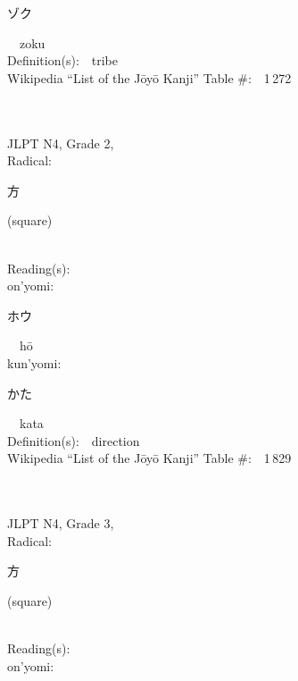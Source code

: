 \begin{multicols}{2}
{\hspace*{2em}}{\begin{CJK}{UTF8}{min} ゾク \end{CJK}}\ \ zoku\ \ \\
Definition(s):\ \ tribe \\
Wikipedia ``List of the J\=oy\=o Kanji'' Table \#:\ \ 1\,272 \\
\ \ \\
{\fontsize{34pt}{40pt}  }\ \ \\  %
{JLPT N4, Grade 2, \\Radical:\ \ {\begin{CJK}{UTF8}{min} 方 \end{CJK}} (square) } \\
Reading(s):\ \ \\
{\hspace*{1em}}on'yomi:\ \ \\
{\hspace*{2em}}{\begin{CJK}{UTF8}{min} ホウ \end{CJK}}\ \ h\=o\ \ \\
{\hspace*{1em}}kun'yomi:\ \ \\
{\hspace*{2em}}{\begin{CJK}{UTF8}{min} かた \end{CJK}}\ \ kata\ \ \\
Definition(s):\ \ direction \\
Wikipedia ``List of the J\=oy\=o Kanji'' Table \#:\ \ 1\,829 \\
\ \ \\
{\fontsize{34pt}{40pt}  }\ \ \\  %
{JLPT N4, Grade 3, \\Radical:\ \ {\begin{CJK}{UTF8}{min} 方 \end{CJK}} (square) } \\
Reading(s):\ \ \\
{\hspace*{1em}}on'yomi:\ \ \\

\end{multicols}
